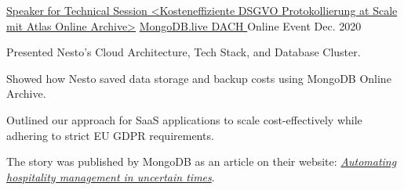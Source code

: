 

\begin{cventries}

  \cventry
    {\href{https://www.youtube.com/watch?v=MjBYAA_WZg4&ab_channel=MongoDB}{Speaker for Technical Session <Kosteneffiziente DSGVO Protokollierung at Scale mit Atlas Online Archive>}} %
    {\href{https://www.youtube.com/watch?v=MjBYAA_WZg4&ab_channel=MongoDB}{MongoDB.live DACH \entrypositionstyle{[German]}}} %
    {Online Event} %
    {Dec. 2020} %
    {
      \begin{cvitems} %
        \item {Presented Nesto's Cloud Architecture, Tech Stack, and Database Cluster.}
        \item {Showed how Nesto saved data storage and backup costs using MongoDB Online Archive.}
        \item {Outlined our approach for SaaS applications to scale cost-effectively while adhering to strict EU GDPR requirements.}
        \item {The story was published by MongoDB as an article on their website: \textit{\href{https://www.mongodb.com/customers/nesto}{Automating hospitality management in uncertain times}}}.
      \end{cvitems}
    }

\end{cventries}
